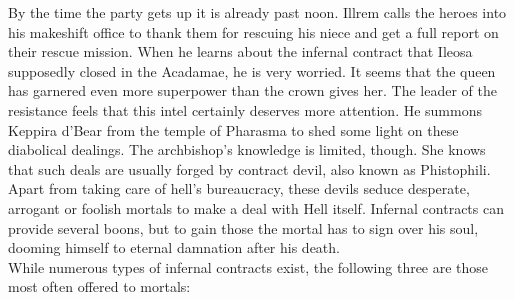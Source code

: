 By the time the party gets up it is already past noon. Illrem calls the heroes into his makeshift office to thank them for rescuing his niece and get a full report on their rescue mission. When he learns about the infernal contract that Ileosa supposedly closed in the Acadamae, he is very worried. It seems that the queen has garnered even more superpower than the crown gives her. The leader of the resistance feels that this intel certainly deserves more attention. He summons Keppira d'Bear from the temple of Pharasma to shed some light on these diabolical dealings. The archbishop's knowledge is limited, though. She knows that such deals are usually forged by contract devil, also known as Phistophili. Apart from taking care of hell's bureaucracy, these devils seduce desperate, arrogant or foolish mortals to make a deal with Hell itself. Infernal contracts can provide several boons, but to gain those the mortal has to sign over his soul, dooming himself to eternal damnation after his death.\\

While numerous types of infernal contracts exist, the following three are those most often offered to mortals:\\

 